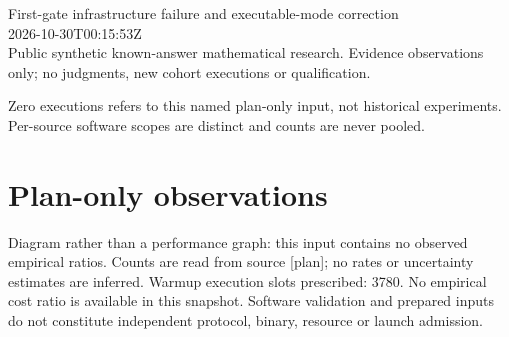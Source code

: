 \documentclass[11pt]{article}
\begin{document}
\raggedright\sloppy
{\LARGE First-gate infrastructure failure and executable-mode correction}\\[5pt]
2026-10-30T00:15:53Z\\
Public synthetic known-answer mathematical research. Evidence observations only; no judgments, new cohort executions or qualification.

Zero executions refers to this named plan-only input, not historical experiments. Per-source software scopes are distinct and counts are never pooled.
\section*{Plan-only observations}
\begin{center}\end{center}
Diagram rather than a performance graph: this input contains no observed empirical ratios. Counts are read from source [plan]; no rates or uncertainty estimates are inferred.
Warmup execution slots prescribed: 3780. No empirical cost ratio is available in this snapshot. Software validation and prepared inputs do not constitute independent protocol, binary, resource or launch admission.
\end{document}
